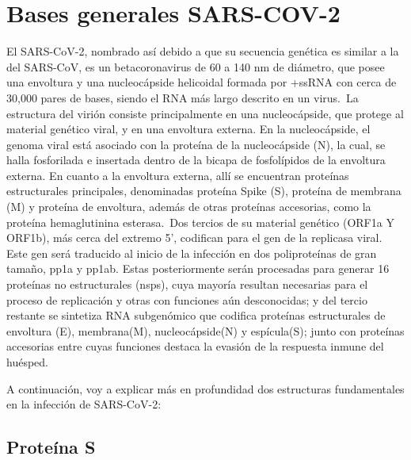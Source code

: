 \documentclass[a4paper,11pt]{report}
\begin{document}
 \section{Bases generales SARS-COV-2}
 El SARS-CoV-2, nombrado así debido a que su secuencia genética es similar a la del SARS-CoV, es un betacoronavirus de 60 a 140 nm de diámetro, que posee una envoltura y una nucleocápside helicoidal formada por +ssRNA con cerca de 30,000 pares de bases, siendo el RNA más largo descrito en un virus.\
La estructura del virión consiste principalmente en una nucleocápside, que protege al material genético viral, y en una envoltura externa. En la nucleocápside, el genoma viral está asociado con la proteína de la nucleocápside (N), la cual, se halla fosforilada e insertada dentro de la bicapa de fosfolípidos de la envoltura externa. En cuanto a la envoltura externa, allí se encuentran proteínas estructurales principales, denominadas proteína Spike (S), proteína de membrana (M) y proteína de envoltura, además de otras proteínas accesorias, como la proteína hemaglutinina esterasa.\
Dos tercios de su material genético (ORF1a Y ORF1b), más cerca del extremo 5’, codifican para el gen de la replicasa viral. Este gen será traducido al inicio de la infección en dos poliproteínas de gran tamaño, pp1a y pp1ab. Estas posteriormente serán procesadas para generar 16 proteínas no estructurales (nsps), cuya mayoría resultan necesarias para el proceso de replicación y otras con funciones aún desconocidas; y del tercio restante se sintetiza RNA subgenómico que codifica proteínas estructurales de envoltura (E), membrana(M), nucleocápside(N) y espícula(S); junto con proteínas accesorias entre cuyas funciones destaca la evasión de la respuesta inmune del huésped.\

A continuación, voy a explicar más en profundidad dos estructuras fundamentales en la infección de SARS-CoV-2:\
 \subsection{Proteína S}
\end{document}

